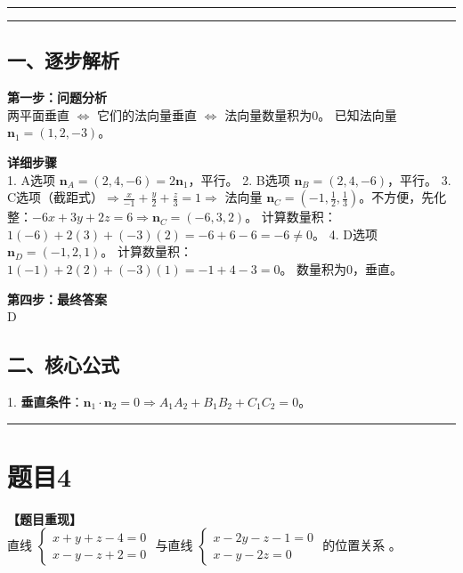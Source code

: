 \documentclass[12pt, a4paper]{ctexart}
\newcommand{\TopSeparator}{
    \par\noindent\rule{\textwidth}{1.5pt}\vspace{0.5em} %
}
\newcommand{\AnalysisSeparator}{
    \par\noindent\rule{\textwidth}{0.5pt}\vspace{0.2em}\hrule\vspace{0.5em} %
}
\newenvironment{RedAnalysis}{
    \par
    \color{red} %
}{
    \par
    \color{black} %
}
\begin{document}
\AnalysisSeparator

\begin{RedAnalysis}

\subsection*{一、逐步解析}

\textbf{第一步：问题分析} \\
两平面垂直 $\Leftrightarrow$ 它们的法向量垂直 $\Leftrightarrow$ 法向量数量积为0。
已知法向量 $\mathbf{n}_1 = (1, 2, -3)$。

\textbf{详细步骤} \\
1. A选项 $\mathbf{n}_A = (2, 4, -6) = 2\mathbf{n}_1$，平行。
2. B选项 $\mathbf{n}_B = (2, 4, -6)$，平行。
3. C选项（截距式）$\Rightarrow \frac{x}{-1} + \frac{y}{2} + \frac{z}{3} = 1 \Rightarrow$ 法向量 $\mathbf{n}_C = (-1, \frac{1}{2}, \frac{1}{3})$。不方便，先化整：$-6x + 3y + 2z = 6 \Rightarrow \mathbf{n}_C = (-6, 3, 2)$。
   计算数量积：$1(-6) + 2(3) + (-3)(2) = -6 + 6 - 6 = -6 \neq 0$。
4. D选项 $\mathbf{n}_D = (-1, 2, 1)$。
   计算数量积：$1(-1) + 2(2) + (-3)(1) = -1 + 4 - 3 = 0$。
   数量积为0，垂直。

\textbf{第四步：最终答案} \\
D

\subsection*{二、核心公式}
1. \textbf{垂直条件}：$\mathbf{n}_1 \cdot \mathbf{n}_2 = 0 \Rightarrow A_1A_2 + B_1B_2 + C_1C_2 = 0$。

\end{RedAnalysis}

\vspace{2em}

\TopSeparator
\section*{题目4}

\textbf{【题目重现】} \\
直线 $\begin{cases}x+y+z-4=0\\ x-y-z+2=0\end{cases}$ 与直线 $\begin{cases}x-2y-z-1=0\\ x-y-2z=0\end{cases}$ 的位置关系 \underline{\hspace{1cm}}。
\end{document}
